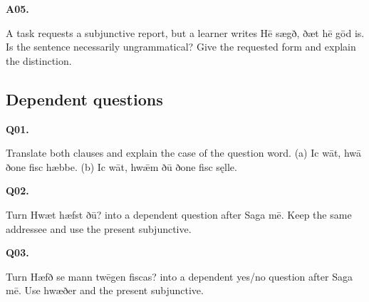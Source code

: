 \par\begin{minipage}{\linewidth}\raggedright
\textbf{A05.}

A task requests a subjunctive report, but a learner writes Hē sægð, ðæt hē gōd is. Is the sentence necessarily ungrammatical? Give the requested form and explain the distinction.

\end{minipage}\par\addvspace{4pt}

\subsection*{Dependent questions}

\par\begin{minipage}{\linewidth}\raggedright
\textbf{Q01.}

Translate both clauses and explain the case of the question word. (a) Ic wāt, hwā ðone fisc hæbbe. (b) Ic wāt, hwǣm ðū ðone fisc sęlle.

\end{minipage}\par\addvspace{4pt}

\par\begin{minipage}{\linewidth}\raggedright
\textbf{Q02.}

Turn Hwæt hæfst ðū? into a dependent question after Saga mē. Keep the same addressee and use the present subjunctive.

\end{minipage}\par\addvspace{4pt}

\par\begin{minipage}{\linewidth}\raggedright
\textbf{Q03.}

Turn Hæfð se mann twēgen fiscas? into a dependent yes/\allowbreak{}no question after Saga mē. Use hwæðer and the present subjunctive.

\end{minipage}\par\addvspace{4pt}

